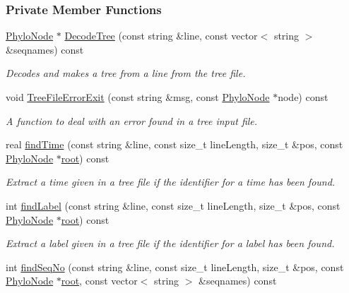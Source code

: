 \subsubsection*{\-Private \-Member \-Functions}
\begin{DoxyCompactItemize}
\item 
\hyperlink{classPhyloNode}{\-Phylo\-Node} $\ast$ \hyperlink{classPhyloTree_a7b301daf15291d5520dc122d3be3578e}{\-Decode\-Tree} (const string \&line, const vector$<$ string $>$ \&seqnames) const 
\begin{DoxyCompactList}\small\item\em \-Decodes and makes a tree from a line from the tree file. \end{DoxyCompactList}\item 
void \hyperlink{classPhyloTree_aed4d7f60f27bef63636280e6a76ed962}{\-Tree\-File\-Error\-Exit} (const string \&msg, const \hyperlink{classPhyloNode}{\-Phylo\-Node} $\ast$node) const 
\begin{DoxyCompactList}\small\item\em \-A function to deal with an error found in a tree input file. \end{DoxyCompactList}\item 
real \hyperlink{classPhyloTree_a91962e00d6d81f2186e2290ce61bf7f1}{find\-Time} (const string \&line, const size\-\_\-t line\-Length, size\-\_\-t \&pos, const \hyperlink{classPhyloNode}{\-Phylo\-Node} $\ast$\hyperlink{classPhyloTree_a38c3253751a7ed9ffacb0978106f8173}{root}) const 
\begin{DoxyCompactList}\small\item\em \-Extract a time given in a tree file if the identifier for a time has been found. \end{DoxyCompactList}\item 
int \hyperlink{classPhyloTree_ae6923fc35a5687504975d460a9769a55}{find\-Label} (const string \&line, const size\-\_\-t line\-Length, size\-\_\-t \&pos, const \hyperlink{classPhyloNode}{\-Phylo\-Node} $\ast$\hyperlink{classPhyloTree_a38c3253751a7ed9ffacb0978106f8173}{root}) const 
\begin{DoxyCompactList}\small\item\em \-Extract a label given in a tree file if the identifier for a label has been found. \end{DoxyCompactList}\item 
int \hyperlink{classPhyloTree_abd9309bd022690e7532c1d4903d7898f}{find\-Seq\-No} (const string \&line, const size\-\_\-t line\-Length, size\-\_\-t \&pos, const \hyperlink{classPhyloNode}{\-Phylo\-Node} $\ast$\hyperlink{classPhyloTree_a38c3253751a7ed9ffacb0978106f8173}{root}, const vector$<$ string $>$ \&seqnames) const 

\end{DoxyCompactItemize}
